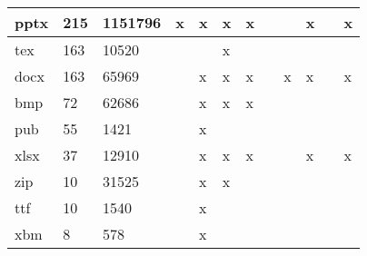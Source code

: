 \begin{table}[!ht]
\begin{tabular}{|l|l|l|l|l|l|l|l|l|l|l|l|}
pptx      & 215             & 1151796       & x & x & x & x &   &   & x &   & x   \\ \hline
tex       & 163             & 10520         &   &   & x &   &   &   &   &   &     \\ \hline
docx      & 163             & 65969         &   & x & x & x &   & x & x &   & x   \\ \hline
bmp       & 72              & 62686         &   & x & x & x &   &   &   &   &     \\ \hline
pub       & 55              & 1421          &   & x &   &   &   &   &   &   &     \\ \hline
xlsx      & 37              & 12910         &   & x & x & x &   &   & x &   & x   \\ \hline
zip       & 10              & 31525         &   & x & x &   &   &   &   &   &     \\ \hline
ttf       & 10              & 1540          &   & x &   &   &   &   &   &   &     \\ \hline
xbm       & 8               & 578           &   & x &   &   &   &   &   &   &     \\ \hline

\end{tabular}
\end{table}

